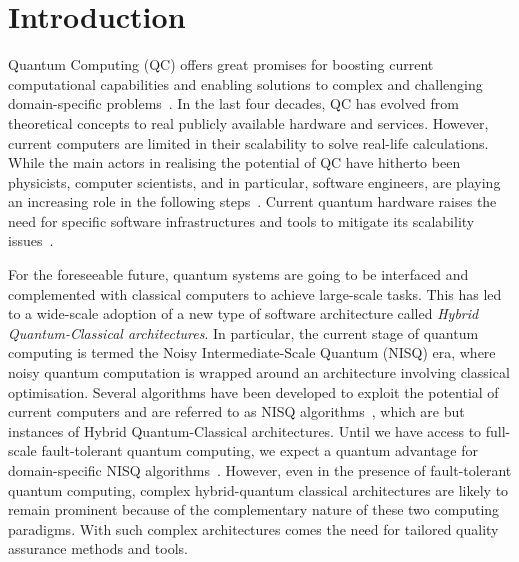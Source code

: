 \section{Introduction}

Quantum Computing (QC) offers great promises for boosting current
computational capabilities and enabling solutions to complex and challenging domain-specific problems~\cite{gheorghe-pop_quantum_2020}. In the last four decades, QC has evolved from theoretical concepts to real publicly available hardware and services. However, current computers are limited in their scalability to solve real-life calculations. While the main actors in realising the potential of QC have hitherto been physicists,
computer scientists, and in particular, software engineers, are playing an increasing role in the following
steps~\cite{miranskyy_testing_2019}. Current quantum hardware raises the
need for specific software infrastructures and tools to mitigate its scalability issues~\cite{greiwe_effects_2023}. 

For the foreseeable future, quantum systems are going to be interfaced and complemented with classical computers to achieve large-scale tasks. This has led to a wide-scale adoption of a new type of software architecture called \emph{Hybrid Quantum-Classical architectures}.  
In particular, the current stage of quantum computing  is termed the Noisy
Intermediate-Scale Quantum (NISQ) era, where noisy quantum computation is wrapped around an architecture involving classical optimisation. Several algorithms have been developed
to exploit the potential of current computers and are referred to as
NISQ algorithms~\cite{lau_nisq_2022}, which are but instances of Hybrid Quantum-Classical architectures. %
Until we have access to full-scale fault-tolerant quantum computing, we expect a quantum advantage for domain-specific NISQ
algorithms~\cite{herrmann_quantum_2023}. However, even in the presence of fault-tolerant quantum computing, complex hybrid-quantum classical architectures are likely to remain prominent because of the complementary nature of these two computing paradigms.  With such complex architectures comes the need for tailored quality assurance methods and tools. 


